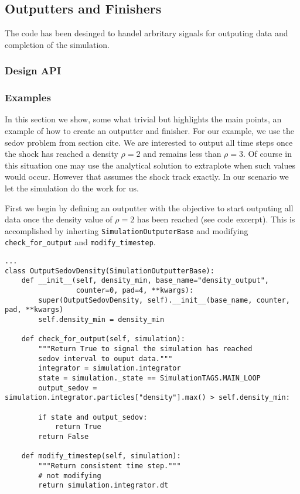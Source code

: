 \subsection{Outputters and Finishers}
\label{sec.outputters}
The code has been desinged to handel arbritary signals for outputing data
and completion of the simulation. 

\subsubsection{Design API}
\subsubsection{Examples}
In this section we show, some what trivial but highlights the main points, an example of
how to create an outputter and finisher. For our example, we use the sedov problem from 
section cite. We are interested to output all time steps once the shock has reached
a density $\rho=2$ and remains less than $\rho=3$. Of course in this situation one may
use the analytical solution to extraplote when such values would occur. However that
assumes the shock track exactly. In our scenario we let the simulation do the work
for us.

First we begin by defining an outputter with the objective to start outputing
all data once the density value of $\rho=2$ has been reached (see code excerpt). This
is accomplished by inherting \lstinline{SimulationOutputerBase} and modifying
\lstinline{check_for_output} and \lstinline{modify_timestep}.


\begin{lstlisting}
...
class OutputSedovDensity(SimulationOutputterBase):
    def __init__(self, density_min, base_name="density_output",
                 counter=0, pad=4, **kwargs):
        super(OutputSedovDensity, self).__init__(base_name, counter, pad, **kwargs)
        self.density_min = density_min 

    def check_for_output(self, simulation):
        """Return True to signal the simulation has reached
        sedov interval to ouput data."""
        integrator = simulation.integrator
        state = simulation._state == SimulationTAGS.MAIN_LOOP
        output_sedov = simulation.integrator.particles["density"].max() > self.density_min:

        if state and output_sedov:
            return True
        return False

    def modify_timestep(self, simulation):
        """Return consistent time step."""
        # not modifying
        return simulation.integrator.dt

\end{lstlisting}

